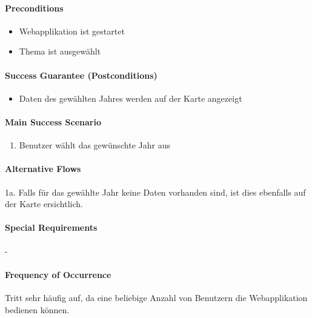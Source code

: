 \paragraph{Preconditions}
\begin{itemize}
\item Webapplikation ist gestartet
\item Thema ist ausgewählt
\end{itemize}

\paragraph{Success Guarantee (Postconditions)}
\begin{itemize}
\item Daten des gewählten Jahres werden auf der Karte angezeigt
\end{itemize}

\paragraph{Main Success Scenario}
\begin{enumerate}
\item Benutzer wählt das gewünschte Jahr aus
\end{enumerate}

\paragraph{Alternative Flows}
1a. Falls für das gewählte Jahr keine Daten vorhanden sind, ist dies ebenfalls auf der Karte ersichtlich.

\paragraph{Special Requirements}
-

\paragraph{Frequency of Occurrence}
Tritt sehr häufig auf, da eine beliebige Anzahl von Benutzern die Webapplikation bedienen können.

